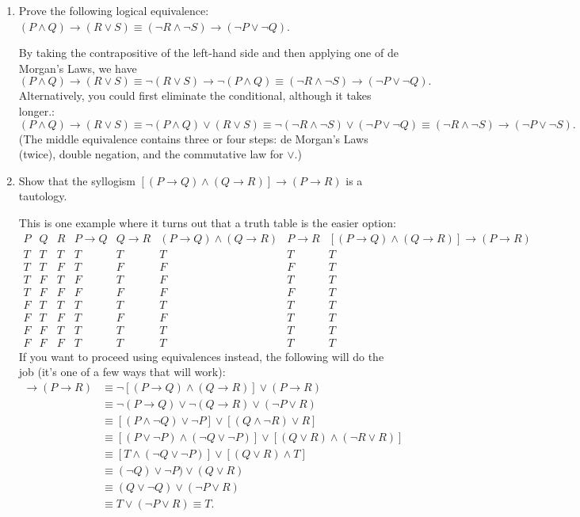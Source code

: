 \documentclass[12pt]{article}
\newcommand{\points}[1]{\marginpar{\hspace{24pt}[#1]}}
\begin{document}
\begin{enumerate}
\begin{enumerate}
\end{enumerate}
\newpage

\item Prove the following logical equivalence: $(P\wedge Q)\to (R\vee S)\equiv (\neg R\wedge \neg S)\to (\neg P\vee \neg Q)$. \points{6}

\bigskip

By taking the contrapositive of the left-hand side and then applying one of de Morgan's Laws, we have
\[
 (P\wedge Q)\to (R\vee S)\equiv \neg(R\vee S)\to \neg (P\wedge Q) \equiv (\neg R\wedge \neg S)\to (\neg P\vee \neg Q).
\]
Alternatively, you could first eliminate the conditional, although it takes longer.:
\[
 (P\wedge Q)\to (R\vee S)\equiv \neg (P\wedge Q)\vee (R\vee S) \equiv \neg (\neg R\wedge \neg S)\vee (\neg P\vee \neg Q)\equiv (\neg R\wedge \neg S)\to (\neg P\vee \neg S).
\]
(The middle equivalence contains three or four steps: de Morgan's Laws (twice), double negation, and the commutative law for $\vee$.)

\bigskip

\item  Show that the syllogism $[(P\to Q)\wedge (Q\to R)]\to (P\to R)$ is a tautology. \points{6}

\bigskip

This is one example where it turns out that a truth table is the easier option:
\[
 \begin{array}{ccc|c|c|c|c|c}
  P&Q&R&P\to Q&Q\to R & (P\to Q)\wedge (Q\to R)& P\to R & [(P\to Q)\wedge (Q\to R)]\to (P\to R)\\
\hline
T&T&T&T&T&T&T&T\\
T&T&F&T&F&F&F&T\\
T&F&T&F&T&F&T&T\\
T&F&F&F&F&F&F&T\\
F&T&T&T&T&T&T&T\\
F&T&F&T&F&F&T&T\\
F&F&T&T&T&T&T&T\\
F&F&F&T&T&T&T&T
 \end{array}
\]
If you want to proceed using equivalences instead, the following will do the job (it's one of a few ways that will work):
\begin{align*}
 [(P\to Q)\wedge (Q\to R)]\to (P\to R)&\equiv \neg [(P\to Q)\wedge (Q\to R)]\vee (P\to R)\\
&\equiv \neg(P\to Q)\vee \neg (Q\to R)\vee (\neg P\vee R)\\
&\equiv [(P\wedge\neg Q)\vee\neg P]\vee [(Q\wedge \neg R)\vee R]\\
&\equiv [(P\vee \neg P)\wedge (\neg Q\vee \neg P)]\vee [(Q\vee R)\wedge (\neg R\vee R)]\\
&\equiv [T\wedge (\neg Q\vee \neg P)]\vee [(Q\vee R)\wedge T]\\
&\equiv (\neg Q)\vee \neg P)\vee (Q\vee R)\\
&\equiv (Q\vee \neg Q)\vee (\neg P\vee R)\\
&\equiv T\vee (\neg P\vee R)\equiv T.
\end{align*}


\end{enumerate}
\end{document}
